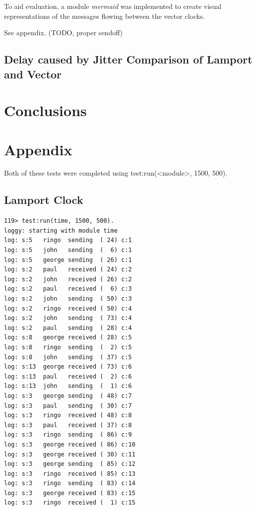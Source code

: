 \documentclass[a4paper, 11pt]{article}
\begin{document}
To aid evaluation, a module \textit{mermaid} was implemented to create visual representations of the messages flowing between the vector clocks.

See appendix. (TODO, proper sendoff)

\subsection{Delay caused by Jitter Comparison of Lamport and Vector}



\section{Conclusions}


\section{Appendix}

Both of these tests were completed using test:run(<module>, 1500, 500).

\subsection{Lamport Clock}
\begin{verbatim}
119> test:run(time, 1500, 500).
loggy: starting with module time
log: s:5   ringo  sending  ( 24) c:1
log: s:5   john   sending  (  6) c:1
log: s:5   george sending  ( 26) c:1
log: s:2   paul   received ( 24) c:2
log: s:2   john   received ( 26) c:2
log: s:2   paul   received (  6) c:3
log: s:2   john   sending  ( 50) c:3
log: s:2   ringo  received ( 50) c:4
log: s:2   john   sending  ( 73) c:4
log: s:2   paul   sending  ( 28) c:4
log: s:8   george received ( 28) c:5
log: s:8   ringo  sending  (  2) c:5
log: s:8   john   sending  ( 37) c:5
log: s:13  george received ( 73) c:6
log: s:13  paul   received (  2) c:6
log: s:13  john   sending  (  1) c:6
log: s:3   george sending  ( 48) c:7
log: s:3   paul   sending  ( 30) c:7
log: s:3   ringo  received ( 48) c:8
log: s:3   paul   received ( 37) c:8
log: s:3   ringo  sending  ( 86) c:9
log: s:3   george received ( 86) c:10
log: s:3   george received ( 30) c:11
log: s:3   george sending  ( 85) c:12
log: s:3   ringo  received ( 85) c:13
log: s:3   ringo  sending  ( 83) c:14
log: s:3   george received ( 83) c:15
log: s:3   ringo  received (  1) c:15
\end{verbatim}
\end{document}
